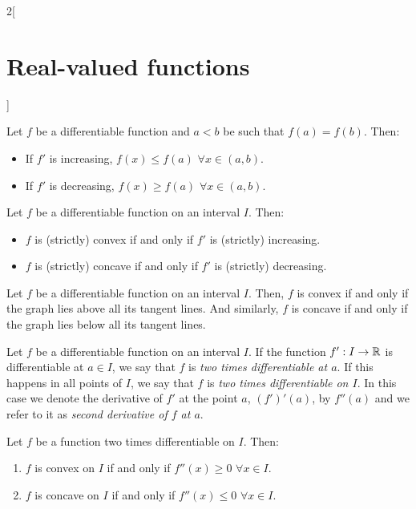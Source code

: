 \documentclass[../../../main.tex]{subfiles}
\begin{document}
\begin{multicols}{2}[\section{Real-valued functions}]
\begin{prop}
    \end{prop}
    \begin{lemma}
        Let $f$ be a differentiable function and $a<b$ be such that $f(a)=f(b)$. Then:
        \begin{itemize}
            \item If $f'$ is increasing, $f(x)\leq f(a)$ $\forall x\in(a,b)$.
            \item If $f'$ is decreasing, $f(x)\geq f(a)$ $\forall x\in(a,b)$.
        \end{itemize}
    \end{lemma}
    \begin{theorem}
        Let $f$ be a differentiable function on an interval $I$. Then:
        \begin{itemize}
            \item $f$ is (strictly) convex if and only if $f'$ is (strictly) increasing.
            \item $f$ is (strictly) concave if and only if $f'$ is (strictly) decreasing.
        \end{itemize}
    \end{theorem}
    \begin{theorem}
        Let $f$ be a differentiable function on an interval $I$. Then, $f$ is convex if and only if the graph lies above all its tangent lines. And similarly, $f$ is concave if and only if the graph lies below all its tangent lines.
    \end{theorem}
    \begin{definition}\label{RVF-second_derivative}
        Let $f$ be a differentiable function on an interval $I$. If the function $f':I\rightarrow\mathbb{R}$ is differentiable at $a\in I$, we say that $f$ is \textit{two times differentiable at $a$}. If this happens in all points of $I$, we say that $f$ is \textit{two times differentiable on $I$}. In this case we denote the derivative of $f'$ at the point $a$, $(f')'(a)$, by $f''(a)$ and we refer to it as \textit{second derivative of $f$ at $a$}.
    \end{definition}
    \begin{theorem}
        Let $f$ be a function two times differentiable on $I$. Then:
        \begin{enumerate}
            \item $f$ is convex on $I$ if and only if $f''(x)\geq 0$ $\forall x\in I$.
            \item $f$ is concave on $I$ if and only if $f''(x)\leq 0$ $\forall x\in I$.
        \end{enumerate}

\end{theorem}
\end{multicols}
\end{document}

